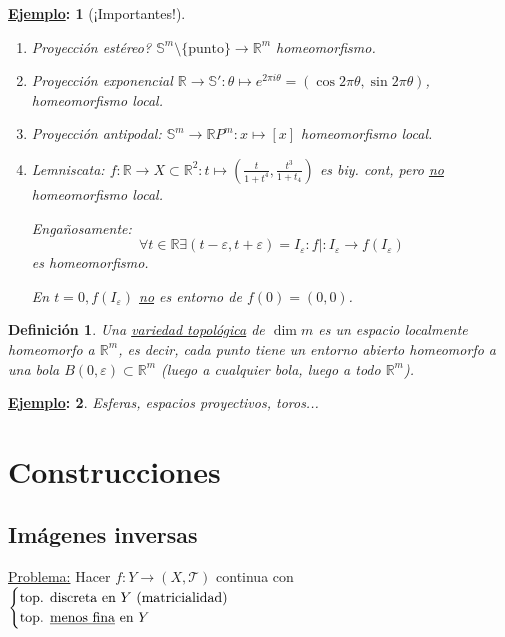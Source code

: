 \documentclass[10pt,a4paper,openright]{book}
\theoremstyle{break}
\newtheorem*{defi}{Definición}
\newtheorem*{ej}{\underline{Ejemplo}:}
\begin{document}
\begin{ej}[¡Importantes!]
\begin{enumerate}
    \item Proyección estéreo? $\mathbb{S}^{m} \setminus \{\text{punto}\} \rightarrow \mathbb{R}^m$ homeomorfismo.
    \item Proyección exponencial $\mathbb{R} \rightarrow \mathbb{S}': \theta \mapsto e^{2\pi i\theta} = \left( \cos 2\pi \theta, \sin 2\pi \theta \right)$, homeomorfismo local.
    \item Proyección antipodal: $\mathbb{S}^m \rightarrow \mathbb{R}P^{m}: x \mapsto \left[ x \right]$ homeomorfismo local.
    \item Lemniscata: $f: \mathbb{R} \rightarrow X \subset \mathbb{R}^2: t \mapsto \left( \frac{t}{1 + t^4}, \frac{t^3}{1 + t_4} \right)$ es biy. cont, pero \underline{no} homeomorfismo local.

    Engañosamente: 
    \[
        \forall t \in \mathbb{R} \exists \left( t - \varepsilon, t + \varepsilon \right) = I_{\varepsilon}: f| : I_{\varepsilon} \rightarrow f\left( I_{\varepsilon} \right) 
    \]
    es homeomorfismo.

    En $t = 0, f\left( I_{\varepsilon} \right)$ \underline{no} es entorno de $f\left( 0 \right) = \left( 0, 0 \right)$.
\end{enumerate} 
\end{ej}

\begin{defi}
Una \underline{variedad topológica} de $\dim m$ es un espacio localmente homeomorfo a $\mathbb{R}^m$, es decir, cada punto tiene un entorno abierto homeomorfo a una bola $B\left( 0, \varepsilon \right) \subset \mathbb{R}^m$ (luego a cualquier bola, luego a todo $\mathbb{R}^m$).
\end{defi}
\begin{ej}
Esferas, espacios proyectivos, toros...
\end{ej}

\chapter{Construcciones}%
\label{cha:construcciones}
\section{Imágenes inversas}%
\label{sec:imagenes_inversas}
\underline{Problema:} Hacer $f: Y \rightarrow \left( X, \mathcal{T} \right)$ continua con $\begin{cases}
    \text{top. discreta en } Y \text{ (matricialidad)}\\
    \text{top. \underline{menos fina} en } Y 
\end{cases}$ 
\end{document}
